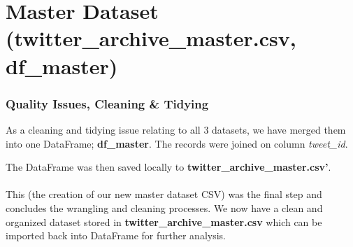 \documentclass[10pt,a4paper]{report}
\begin{document}
\section{Master Dataset (\textbf{twitter\_archive\_master.csv}, \textbf{df\_master})}
	\subsubsection{Quality Issues, Cleaning \& Tidying}
	As a cleaning and tidying issue relating to all 3 datasets, we have merged them into one DataFrame; \textbf{df\_master}. The records were joined on column \textit{tweet\_id}.

	The DataFrame was then saved locally to  \textbf{twitter\_archive\_master.csv'}. \\ \\ 


	This (the creation of our new master dataset CSV) was the final step and concludes the wrangling and cleaning processes. 
	We now have a clean and organized dataset stored in \textbf{twitter\_archive\_master.csv} which can be imported back into DataFrame for
	further analysis. 
\end{document}
